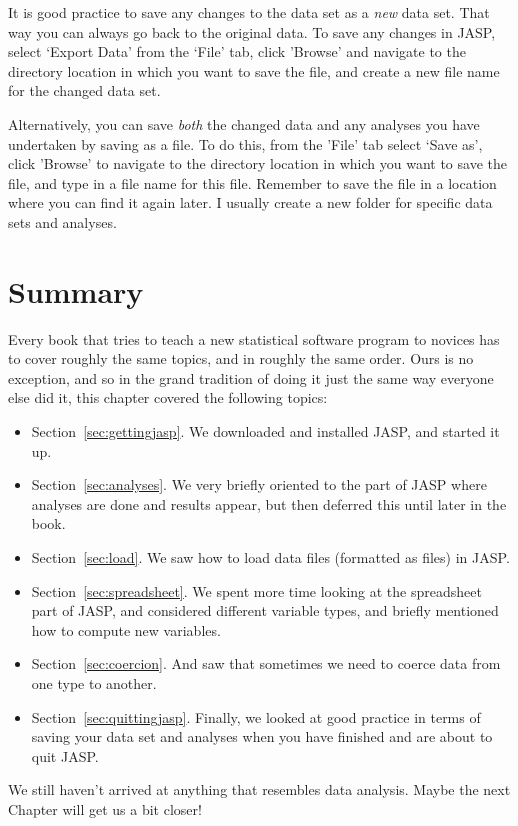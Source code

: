 It is good practice to save any changes to the data set as a {\it new} data set. That way you can always go back to the original data. To save any changes in JASP, select `Export Data' from the `File' tab, click 'Browse' and navigate to the directory location in which you want to save the file, and create a new file name for the changed data set.

Alternatively, you can save {\it both} the changed data and any analyses you have undertaken by saving as a  file. To do this, from the 'File' tab select `Save as', click 'Browse' to navigate to the directory location in which you want to save the file, and type in a file name for this  file. Remember to save the file in a location where you can find it again later. I usually create a new folder for specific data sets and analyses.  


\section{Summary}

Every book that tries to teach a new statistical software program to novices has to cover roughly the same topics, and in roughly the same order. Ours is no exception, and so in the grand tradition of doing it just the same way everyone else did it, this chapter covered the following topics:

\begin{itemize}
\item Section~\ref{sec:gettingjasp}. We downloaded and installed JASP, and started it up.
\item Section~\ref{sec:analyses}. We very briefly oriented to the part of JASP where analyses are done and results appear, but then deferred this until later in the book.
\item Section~\ref{sec:load}. We saw how to load data files (formatted as  files) in JASP.
\item Section~\ref{sec:spreadsheet}. We spent more time looking at the spreadsheet part of JASP, and considered different variable types, and briefly mentioned how to compute new variables.
\item Section~\ref{sec:coercion}. And saw that sometimes we need to coerce data from one type to another.
\item Section~\ref{sec:quittingjasp}. Finally, we looked at good practice in terms of saving your data set and analyses when you have finished and are about to quit JASP.
\end{itemize}

\noindent
We still haven't arrived at anything that resembles data analysis. Maybe the next Chapter will get us a bit closer!



